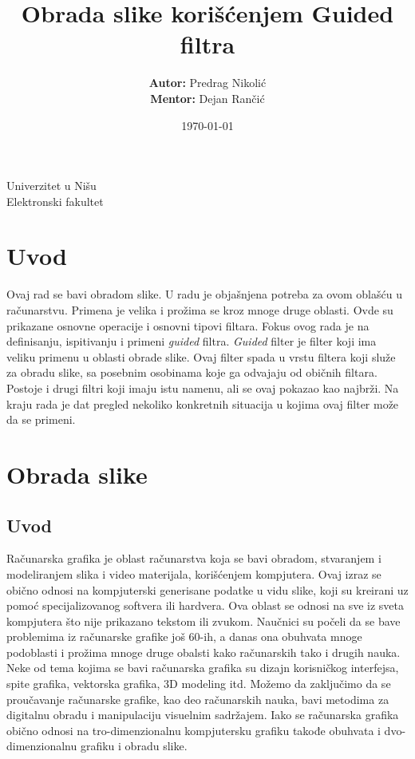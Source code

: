 \documentclass[a4paper,12pt,titlepage]{article}
\title{\Huge {\textbf{Obrada slike korišćenjem Guided filtra}}}
\author{\textbf{Autor:} Predrag Nikolić \\ \textbf{Mentor:} Dejan Rančić}
\date{\today}
\begin{document}
\begin{center}
\large Univerzitet u Nišu \\ Elektronski fakultet
\end{center}

\begin{minipage}{\textwidth}
   \maketitle   
\end{minipage}
\thispagestyle{empty}
\newpage

\tableofcontents
\thispagestyle{empty}
\newpage


\section{Uvod}%

Ovaj rad se bavi obradom slike. U radu je objašnjena potreba za ovom oblašću u računarstvu. Primena je velika i prožima se kroz mnoge druge oblasti. Ovde su prikazane osnovne operacije i osnovni tipovi filtara. Fokus ovog rada je na definisanju, ispitivanju i primeni \emph{guided} filtra. \emph{Guided} filter je filter koji ima veliku primenu u oblasti obrade slike. Ovaj filter spada u vrstu filtera koji služe za obradu slike, sa posebnim osobinama koje ga odvajaju od običnih filtara. Postoje i drugi filtri koji imaju istu namenu, ali se ovaj pokazao kao najbrži. Na kraju rada je dat pregled nekoliko konkretnih situacija u kojima ovaj filter može da se primeni.

\section{Obrada slike}%

\subsection{Uvod}%

Računarska grafika je oblast računarstva koja se bavi obradom, stvaranjem i modeliranjem slika i video materijala, korišćenjem kompjutera. 
Ovaj izraz se obično odnosi na kompjuterski generisane podatke u vidu slike, koji su kreirani uz pomoć specijalizovanog softvera ili hardvera.
Ova oblast se odnosi na sve iz sveta kompjutera što nije prikazano tekstom ili zvukom.
Naučnici su počeli da se bave problemima iz računarske grafike još 60-ih, a danas ona obuhvata mnoge podoblasti i prožima mnoge druge
obalsti kako računarskih tako i drugih nauka. Neke od tema kojima se bavi računarska grafika su dizajn korisničkog interfejsa, spite grafika, vektorska grafika, 3D modeling itd. Možemo da zaključimo da se proučavanje računarske grafike, kao deo računarskih nauka, bavi metodima
za digitalnu obradu i manipulaciju visuelnim sadržajem. Iako se računarska grafika obično odnosi na tro-dimenzionalnu kompjutersku grafiku
takođe obuhvata i dvo-dimenzionalnu grafiku i obradu slike. 
\end{document}
